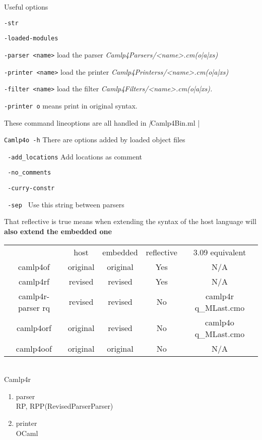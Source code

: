 \documentclass[svgnames,12pt,a4paper]{report}
\begin{document}
Useful options 

\verb|-str|

\verb|-loaded-modules|

\verb|-parser <name>| load the parser \textit{Camlp4Parsers/<name>.cm(o|a|xs)}


\verb|-printer <name>| load the printer
\textit{Camlp4Printerss/<name>.cm(o|a|xs)}

\verb|-filter <name>| load the filter 
\textit{Camlp4Filters/<name>.cm(o|a|xs).}


\verb|-printer o| means print in original syntax. 


These command lineoptions are all handled in \emph|Camlp4Bin.ml |

\verb|Camlp4o -h| 
There are options added by loaded object files


\verb| -add_locations| Add locations as comment


\verb| -no_comments|


\verb| -curry-constr |


\verb| -sep | Use this string between parsers 


That reflective is true means when extending the syntax of the host
language will \textbf{ also extend the embedded one}


  \begin{tabular}{|c|c|c|c|c|}
    \hline
                      & host     & embedded & reflective & 3.09 equivalent     \\
    camlp4of          & original & original & Yes        & N/A                 \\
    camlp4rf          & revised  & revised  & Yes        & N/A                 \\
    camlp4r-parser rq & revised  & revised  & No         & camlp4r q\_MLast.cmo \\
    camlp4orf         & original & revised  & No         & camlp4o q\_MLast.cmo \\
    camlp4oof         & original & original & No         & N/A                 \\
    \hline
  \end{tabular} \\
  
Camlp4r
    \begin{enumerate}
    \item parser \\
      RP, RPP(RevisedParserParser)
    \item printer \\
      OCaml
    \end{enumerate}
\end{document}
